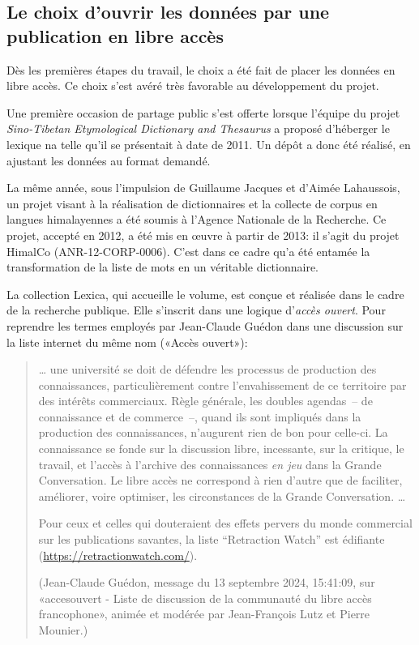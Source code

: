 \subsection{Le choix d'ouvrir les données par une publication en libre accès}

Dès les premières étapes du travail, le choix a été fait de placer les données en libre accès. Ce choix s'est avéré très favorable au développement du projet.

Une première occasion de partage public s'est offerte lorsque l'équipe du projet \emph{Sino-Tibetan Etymological Dictionary and Thesaurus} \parencite{stedt} a proposé d'héberger le lexique na telle qu'il se présentait à date de 2011. Un dépôt a donc été réalisé, en ajustant les données au format demandé.

La même année, sous l'impulsion de Guillaume Jacques et d'Aimée Lahaussois, un projet visant à la réalisation de dictionnaires et la collecte de corpus en langues himalayennes a été soumis à l'{Agence Nationale de la Recherche}. Ce projet, accepté en 2012, a été mis en œuvre à partir de 2013: il s'agit du projet HimalCo (ANR-12-CORP-0006). C'est dans ce cadre qu'a été entamée la transformation de la liste de mots en un véritable dictionnaire.

La collection Lexica, qui accueille le volume, est conçue et réalisée dans le cadre de la recherche publique. Elle s'inscrit dans une logique d'\emph{accès ouvert}. Pour reprendre les termes employés par Jean-Claude Guédon dans une discussion sur la liste internet du même nom («Accès ouvert»):

\begin{quotation}
    {\dots} une université se doit de défendre les processus de production des connaissances, particulièrement contre l'envahissement de ce territoire par des intérêts commerciaux. Règle générale, les doubles agendas~-- de connaissance et de commerce~--, quand ils sont impliqués dans la production des connaissances, n'augurent rien de bon pour celle-ci. La connaissance se fonde sur la discussion libre, incessante, sur la critique, le travail, et l'accès à l'archive des connaissances \emph{en jeu} dans la Grande Conversation. Le libre accès ne correspond à rien d'autre que de faciliter, améliorer, voire optimiser, les circonstances de la Grande Conversation. {\dots}

    Pour ceux et celles qui douteraient des effets pervers du monde commercial sur les publications savantes, la liste “Retraction Watch” est édifiante (\url{https://retractionwatch.com/}).

    (Jean-Claude Guédon, message du 13 septembre 2024, 15:41:09, sur «accesouvert - Liste de discussion de la communauté du libre accès francophone», animée et modérée par Jean-François Lutz et Pierre Mounier.)
\end{quotation}


